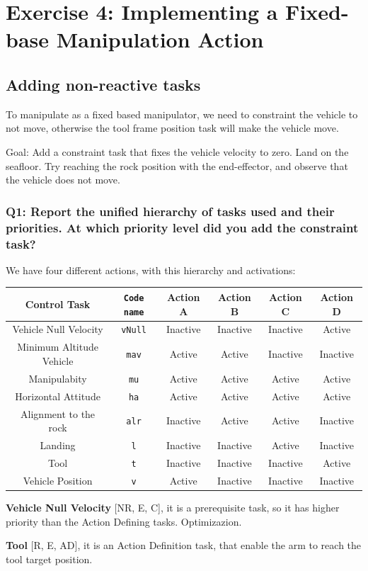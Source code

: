 \documentclass{article}
\newcommand{\doubt} {\marginpar{?}}
\begin{document}
\clearpage
\section{Exercise 4: Implementing a Fixed-base Manipulation Action}
\subsection{Adding non-reactive tasks} \label{subsec:non-react}
To manipulate as a fixed based manipulator, we need to constraint the vehicle to not move, otherwise the tool frame position task will make the vehicle move.

Goal: Add a constraint task that fixes the vehicle velocity to zero. Land on the seafloor. Try reaching the rock position with the end-effector, and observe that the vehicle does not move.

\subsubsection{Q1: Report the unified hierarchy of tasks used and their priorities. At which priority level did you add the constraint task?}
We have four different actions, with this hierarchy and activations:
\begin{center}
\begin{tabular}{ | c | c | c | c | c | c |}
\hline
 Control Task & \texttt{Code name} & Action A & Action B & Action C & Action D\\
 \hline
 Vehicle Null Velocity & \texttt{vNull} & Inactive & Inactive & Inactive & Active\\
 Minimum Altitude Vehicle &  \texttt{mav} & Active & Active & Inactive & Inactive \\  
 Manipulabity &  \texttt{mu} & Active & Active & Active & Active  \\
 Horizontal Attitude &  \texttt{ha} & Active & Active & Active & Active\\
 Alignment to the rock & \texttt{alr} & Inactive & Active & Active & Inactive \\
 Landing & \texttt{l} &Inactive & Inactive & Active & Inactive\\
 Tool  &  \texttt{t} & Inactive & Inactive & Inactive & Active\\
 Vehicle Position &  \texttt{v} &Active & Inactive & Inactive & Inactive\\
 \hline
\end{tabular}
\end{center}
\begin{description}
\item \textbf{Vehicle Null Velocity} [NR, E, C], it is a prerequisite task, so it has higher priority than the Action Defining tasks. Optimizazion.  \doubt
\item \textbf{Tool} [R, E, AD], it is an Action Definition task, that enable the arm to reach the tool target position. 
\end{description}
\end{document}
